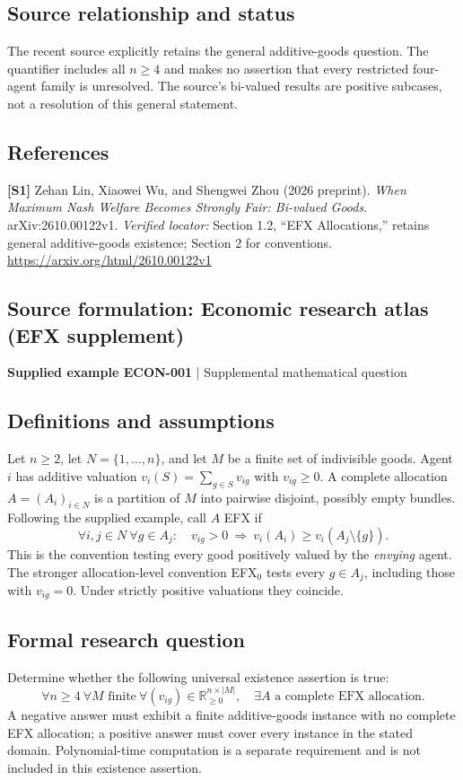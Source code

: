 \documentclass[11pt,a4paper]{article}
\begin{document}
\subsection*{Source relationship and status}
The recent source explicitly retains the general additive-goods question. The quantifier includes all $n\geq4$ and makes no assertion that every restricted four-agent family is unresolved. The source's bi-valued results are positive subcases, not a resolution of this general statement.
\subsection*{References}
\begingroup\footnotesize\raggedright
\textbf{[S1]} Zehan Lin, Xiaowei Wu, and Shengwei Zhou (2026 preprint). \emph{When Maximum Nash Welfare Becomes Strongly Fair: Bi-valued Goods}. arXiv:2610.00122v1. \textit{Verified locator:} Section 1.2, ``EFX Allocations,'' retains general additive-goods existence; Section 2 for conventions. \url{https://arxiv.org/html/2610.00122v1}
\par\endgroup

\subsection*{Source formulation: Economic research atlas (EFX supplement)}
\label{atlas:app:efx}
{\sffamily\small\color{muted}\textbf{Supplied example ECON-001} | Supplemental mathematical question\par}
\subsection*{Definitions and assumptions}
Let $n\geq2$, let $N=\{1,\ldots,n\}$, and let $M$ be a finite set of indivisible goods. Agent $i$ has additive valuation $v_i(S)=\sum_{g\in S}v_{ig}$ with $v_{ig}\geq0$. A complete allocation $A=(A_i)_{i\in N}$ is a partition of $M$ into pairwise disjoint, possibly empty bundles. Following the supplied example, call $A$ EFX if
\[
\forall i,j\in N\ \forall g\in A_j:\quad
v_{ig}>0\ \Longrightarrow\ v_i(A_i)\geq v_i(A_j\setminus\{g\}).
\]
This is the convention testing every good positively valued by the \emph{envying} agent. The stronger allocation-level convention EFX$_0$ tests every $g\in A_j$, including those with $v_{ig}=0$. Under strictly positive valuations they coincide.
\subsection*{Formal research question}
Determine whether the following universal existence assertion is true:
\[
\forall n\geq4\ \forall M\text{ finite}\ \forall (v_{ig})\in\mathbb R_{\geq0}^{n\times|M|},
\quad \exists A\text{ a complete EFX allocation}.
\]
A negative answer must exhibit a finite additive-goods instance with no complete EFX allocation; a positive answer must cover every instance in the stated domain. Polynomial-time computation is a separate requirement and is not included in this existence assertion.
\end{document}
